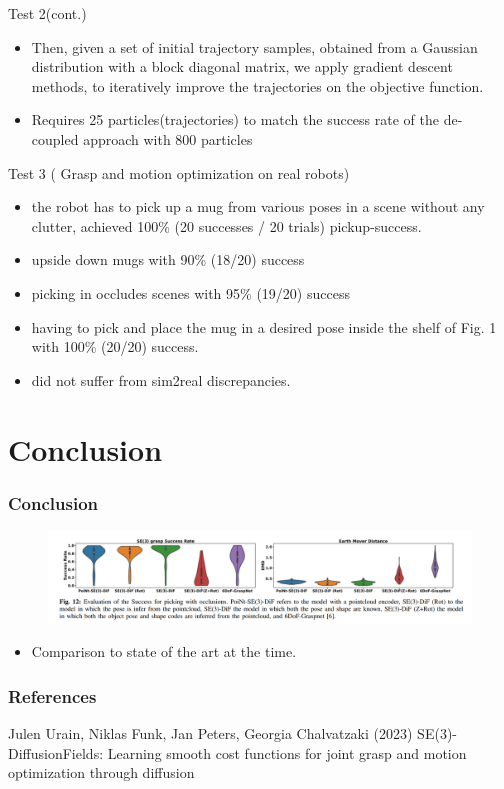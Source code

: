 \documentclass{beamer}
\begin{document}
\begin{frame}{Test 2(cont.)}
    \begin{itemize}
    \item Then, given a
    set of initial trajectory samples, obtained from a Gaussian
    distribution with a block diagonal matrix, we apply
    gradient descent methods, to iteratively improve the
    trajectories on the objective function. 
    \item Requires 25 particles(trajectories) to match the success rate of the de-
    coupled approach with 800 particles
    \end{itemize}
\end{frame}

\begin{frame}{Test 3 ( Grasp and motion optimization on real robots)}
    \begin{itemize}
        \item the robot has to pick
up a mug from various poses in a scene without any clutter,
achieved 100\% (20 successes / 20 trials) pickup-success.
\item upside down mugs with 90\% (18/20) success
\item picking in occludes scenes with 95\% (19/20) success
\item having to pick and place the mug in a desired pose inside the shelf of Fig. 1
with 100\% (20/20) success.
\item did not suffer from sim2real discrepancies.
    \end{itemize}
\end{frame}


\section{Conclusion}
\begin{frame}\frametitle{Conclusion}
\begin{figure}
    \includegraphics[width=12cm]{results_soa.png}
\end{figure}
\begin{itemize}
\item Comparison to state of the art at the time. 
\end{itemize}
\end{frame}


\begin{frame}
\frametitle{References}
\footnotesize{
\begin{thebibliography}{99} 
 Julen Urain, Niklas Funk, Jan Peters, Georgia Chalvatzaki (2023)
\newblock SE(3)-DiffusionFields: Learning smooth cost functions for joint grasp and motion optimization through diffusion
\end{thebibliography}
}
\end{frame}

\end{document}

